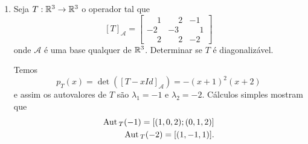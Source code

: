 \begin{exemplo}
\begin{enumerate}[label={\arabic*})]
\begin{solucao}
\begin{itemize}
\[\begin{bmatrix}
                        2 & -3 & -4\\
                        0 & \phantom{-}2 & \phantom{-}5\\
                        0 & \phantom{-}0 & \phantom{-}0
                    \end{bmatrix}\begin{bmatrix}
                        x\\y\\z
                    \end{bmatrix} = \begin{bmatrix}
                        0\\0\\0
                    \end{bmatrix}.
                \]
                Assim
                \[
                    \aut_T(1) = \{(-7z/4,-5z/2,z) \mid z \in \real\} = [(-7/4,-5/2,1)]
                \]
                e ent\~ao $\mathcal{B}_2 = \{(-7/4,-5/2,1)\}$ \'e uma base de $\aut_T(1)$ e $\dim_\real\aut_T(1) = 1$.
            \end{itemize}
            Note que o conjunto $\mathcal{B} = \mathcal{B}_1 \cup \mathcal{B}_2$ \'e L.I. mas n\~ao \'e uma base de $\real^3$. Neste caso o operador $T$ n\~ao \'e diagonaliz\'avel.
        \end{solucao}
        \item Seja $T : \mathbb{R}^3 \to \mathbb{R}^3$ o operador tal que
        \[
            [T]_\mathcal{A} = \begin{bmatrix}
                                \phantom{-}1 & \phantom{-}2 & -1\\
                                -2 & -3 & \phantom{-}1\\
                                \phantom{-}2 & \phantom{-}2 & -2
                            \end{bmatrix}
        \]
        onde $\mathcal{A}$ \'e uma base qualquer de $\real^3$. Determinar se $T$ \'e diagonaliz\'avel.
        \begin{solucao}
        Temos
        \[
                p_T(x) = \det([T - xId]_\mathcal{A}) = -(x + 1)^2(x + 2)
            \]
            e assim os autovalores de $T$ s\~ao $\lambda_1 = -1$ e $\lambda_2 = -2$. C\'alculos simples mostram que
            \begin{align*}
                {\rm Aut\,}_T(-1) = [(1,0,2); (0,1,2)]\\
                {\rm Aut\,}_T(-2) = [(1,-1,1)].
            \end{align*}

\end{solucao}
\end{enumerate}
\end{exemplo}
